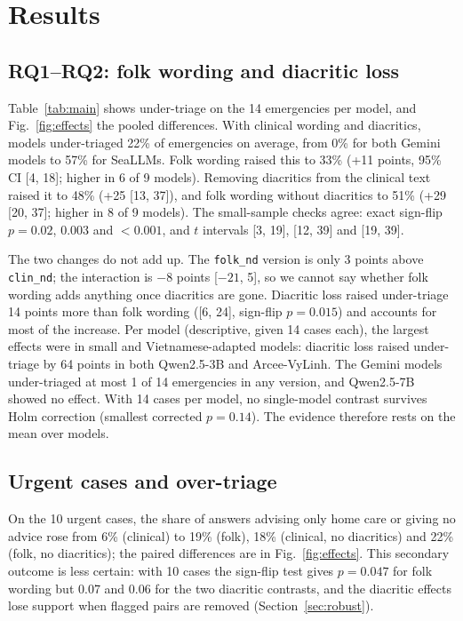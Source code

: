 \documentclass[runningheads]{llncs}
\newcommand{\TODO}[1]{\textcolor{red}{[TODO: #1]}}
\newcommand{\maybeinput}[1]{\IfFileExists{#1}{}{\TODO{\detokenize{#1}}}}
\begin{document}
\section{Results}

\subsection{RQ1--RQ2: folk wording and diacritic loss}
Table~\ref{tab:main} shows under-triage on the 14 emergencies per model, and Fig.~\ref{fig:effects} the pooled differences. With clinical wording and diacritics, models under-triaged 22\% of emergencies on average, from 0\% for both Gemini models to 57\% for SeaLLMs. Folk wording raised this to 33\% (+11 points, 95\% CI [4, 18]; higher in 6 of 9 models). Removing diacritics from the clinical text raised it to 48\% (+25 [13, 37]), and folk wording without diacritics to 51\% (+29 [20, 37]; higher in 8 of 9 models). The small-sample checks agree: exact sign-flip $p=0.02$, $0.003$ and $<0.001$, and $t$ intervals [3, 19], [12, 39] and [19, 39].

The two changes do not add up. The \texttt{folk\_nd} version is only 3 points above \texttt{clin\_nd}; the interaction is $-8$ points [$-21$, 5], so we cannot say whether folk wording adds anything once diacritics are gone. Diacritic loss raised under-triage 14 points more than folk wording ([6, 24], sign-flip $p=0.015$) and accounts for most of the increase. Per model (descriptive, given 14 cases each), the largest effects were in small and Vietnamese-adapted models: diacritic loss raised under-triage by 64 points in both Qwen2.5-3B and Arcee-VyLinh. The Gemini models under-triaged at most 1 of 14 emergencies in any version, and Qwen2.5-7B showed no effect. With 14 cases per model, no single-model contrast survives Holm correction (smallest corrected $p=0.14$). The evidence therefore rests on the mean over models.

\begin{table}[t]\centering\scriptsize
\caption{Under-triage (\%) on emergencies by version, and paired differences in percentage points with 95\% bootstrap CI over cases. No per-model difference is significant after Holm correction (exact McNemar). An interval of [+0, +0] means no case changed, not a precise estimate.}\label{tab:main}
\resizebox{\linewidth}{!}{\maybeinput{tables/main.tex}}
\end{table}

\subsection{Urgent cases and over-triage}
On the 10 urgent cases, the share of answers advising only home care or giving no advice rose from 6\% (clinical) to 19\% (folk), 18\% (clinical, no diacritics) and 22\% (folk, no diacritics); the paired differences are in Fig.~\ref{fig:effects}. This secondary outcome is less certain: with 10 cases the sign-flip test gives $p=0.047$ for folk wording but 0.07 and 0.06 for the two diacritic contrasts, and the diacritic effects lose support when flagged pairs are removed (Section~\ref{sec:robust}).
\end{document}
